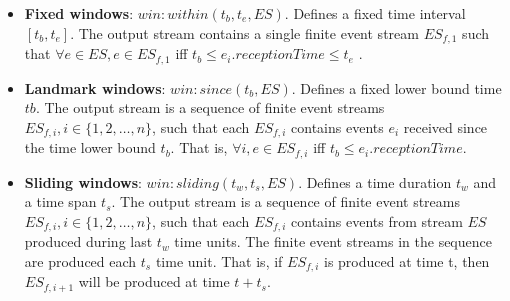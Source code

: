 \begin{itemize} 
\item \textbf{Fixed windows}: $win:within(t_b, t_e, ES)$. Defines a fixed time interval $[t_b, t_e]$. The output stream contains a single finite event stream $ES_{f,1}$ such that $\forall e \in ES, e \in ES_{f,1}$ iff $t_b \leq e_i.receptionTime \leq t_e $ .
\item \textbf{Landmark windows}: $win:since(t_b, ES)$. Defines a fixed lower bound time $tb$. The output stream is a sequence of finite event streams $ES_{f,i}, i \in \{1, 2, …, n\}$, such that each $ES_{f,i}$ contains events $e_i$ received since the time lower bound $t_b$. That is, $\forall i, e \in ES_{f,i}$ iff $t_b \leq e_i.receptionTime$.
\item \textbf{Sliding windows}: $win:sliding(t_w, t_s, ES)$. Defines a time duration $t_w$ and a time span $t_s$. The output stream
is a sequence of finite event streams  $ES_{f,i}, i \in \{1, 2, …, n\}$, such that each $ES_{f,i}$ contains events from stream $ES$ produced 
during last $t_w$ time units. The finite event streams in the sequence are produced each $t_s$ time unit. That is, if $ES_{f,i}$ is produced at time t, then $ES_{f,i+1}$ will be produced at time $t+t_s$. 
\end{itemize}

